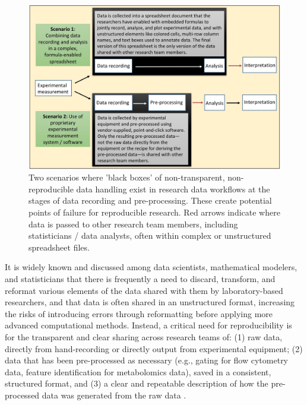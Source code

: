 \documentclass[]{tufte-book}
\begin{document}
\begin{figure}

{\centering \includegraphics[width=30.64in]{figures/existing_blackboxes} 

}

\caption[Two scenarios where 'black boxes' of non-transparent, non-reproducible data handling exist in research data workflows at the stages of data recording and pre-processing]{Two scenarios where 'black boxes' of non-transparent, non-reproducible data handling exist in research data workflows at the stages of data recording and pre-processing. These create potential points of failure for reproducible research. Red arrows indicate where data is passed to other research team members, including statisticians / data analysts, often within complex or unstructured spreadsheet files.}\label{fig:workflow}
\end{figure}

It is widely known and discussed among data scientists, mathematical modelers,
and statisticians \citep{broman2018data, krishnan2016towards} that there is
frequently a need to discard, transform, and reformat various elements of the
data shared with them by laboratory-based researchers, and that data is often
shared in an unstructured format, increasing the risks of introducing errors
through reformatting before applying more advanced computational methods.
Instead, a critical need for reproducibility is for the transparent and clear
sharing across research teams of: (1) raw data, directly from hand-recording or
directly output from experimental equipment; (2) data that has been
pre-processed as necessary (e.g., gating for flow cytometry data, feature
identification for metabolomics data), saved in a consistent, structured format,
and (3) a clear and repeatable description of how the pre-processed data was
generated from the raw data \citep{broman2018data, ellis2018share}.
\end{document}
